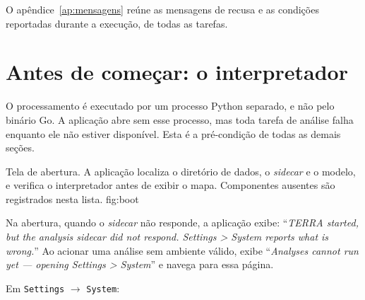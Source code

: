 \documentclass[12pt,a4paper]{article}
\newcommand{\msg}[1]{``\textit{#1}''}
\begin{document}
O ap\^endice~\ref{ap:mensagens} re\'une as mensagens de recusa e as
condi\c{c}\~oes reportadas durante a execu\c{c}\~ao, de todas as tarefas.

\section{Antes de come\c{c}ar: o interpretador}

O processamento \'e executado por um processo Python separado, e n\~ao pelo
bin\'ario Go. A aplica\c{c}\~ao abre sem esse processo, mas toda tarefa de
an\'alise falha enquanto ele n\~ao estiver dispon\'ivel. Esta \'e a
pr\'e-condi\c{c}\~ao de todas as demais se\c{c}\~oes.

%
  {Tela de abertura. A aplica\c{c}\~ao localiza o diret\'orio de dados, o
   \emph{sidecar} e o modelo, e verifica o interpretador antes de exibir o
   mapa. Componentes ausentes s\~ao registrados nesta lista.}
  {fig:boot}

 Na abertura, quando o \emph{sidecar} n\~ao
responde, a aplica\c{c}\~ao exibe: \msg{TERRA started, but the analysis
sidecar did not respond. Settings > System reports what is wrong.} Ao acionar
uma an\'alise sem ambiente v\'alido, exibe \msg{Analyses cannot run yet ---
opening Settings > System} e navega para essa p\'agina.

 Em \texttt{Settings} $\rightarrow$ \texttt{System}:
\end{document}
